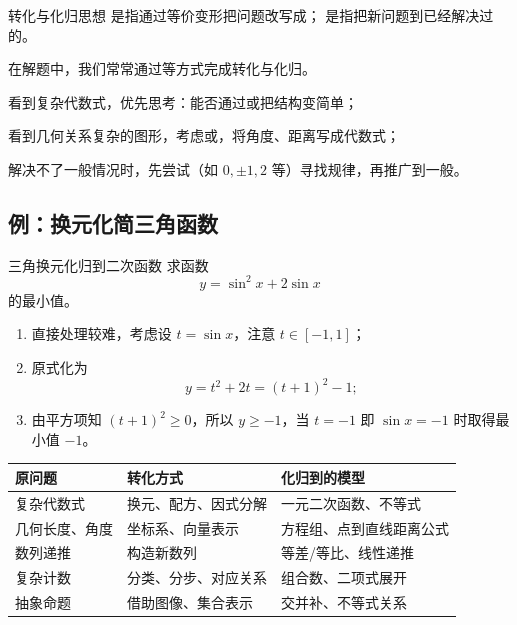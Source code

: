 \documentclass[a4paper,11pt]{ctexart}
\begin{document}
\begin{definitionbox}{转化与化归思想}
是指通过等价变形把问题改写成；
是指把新问题到已经解决过的。
\par
在解题中，我们常常通过等方式完成转化与化归。
\end{definitionbox}

\begin{focuspoints}
  \item 看到复杂代数式，优先思考：能否通过或把结构变简单；
  \item 看到几何关系复杂的图形，考虑或，将角度、距离写成代数式；
  \item 解决不了一般情况时，先尝试（如 $0,\pm1,2$ 等）寻找规律，再推广到一般。
\end{focuspoints}

\subsection{例：换元化简三角函数}

\begin{examplebox}{三角换元化归到二次函数}
求函数
\[
y=\sin^2x+2\sin x
\]
的最小值。

\begin{enumerate}
  \item 直接处理较难，考虑设 $t=\sin x$，注意 $t\in[-1,1]$；
  \item 原式化为
  \[
  y=t^2+2t=(t+1)^2-1;
  \]
  \item 由平方项知 $(t+1)^2\ge 0$，所以 $y\ge -1$，当 $t=-1$ 即 $\sin x=-1$ 时取得最小值 $-1$。
\end{enumerate}
\end{examplebox}

\begin{center}

\vspace{0.5em}
\begin{tabular}{p{} p{} p{}}
\hline
\textbf{原问题} & \textbf{转化方式} & \textbf{化归到的模型} \\
\hline
复杂代数式 & 换元、配方、因式分解 & 一元二次函数、不等式 \\
几何长度、角度 & 坐标系、向量表示 & 方程组、点到直线距离公式 \\
数列递推 & 构造新数列 & 等差/等比、线性递推 \\
复杂计数 & 分类、分步、对应关系 & 组合数、二项式展开 \\
抽象命题 & 借助图像、集合表示 & 交并补、不等式关系 \\
\hline
\end{tabular}
\end{center}
\end{document}
